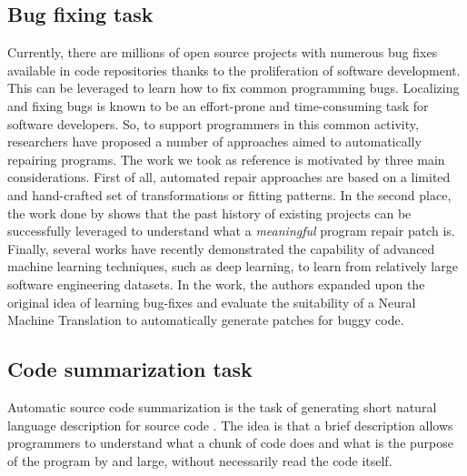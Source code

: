 \subsection{Bug fixing task}
Currently, there are millions of open source projects with numerous bug fixes available in code repositories
thanks to the proliferation of software development. This can be leveraged to learn how to fix common programming bugs. 
Localizing and fixing bugs is known to be an effort-prone and time-consuming task for software developers.
So, to support programmers in this common activity, researchers have proposed a number of approaches aimed to automatically repairing programs.
The work we took as reference is motivated by three main considerations. First of all, automated repair approaches are based on a limited and hand-crafted
set of transformations or fitting patterns. In the second place, the work done by \cite{} shows that the past history of 
existing projects can be successfully leveraged to understand what a \textit{meaningful} program repair patch is. Finally, 
several works have recently demonstrated the capability of advanced machine learning techniques, such as deep learning, to learn from relatively large software engineering
datasets. In the work, the authors expanded upon the original idea of learning bug-fixes and evaluate the suitability of a Neural Machine Translation to automatically
generate patches for buggy code.


\subsection{Code summarization task}
Automatic source code summarization is the task of generating short natural language description 
for source code \cite{Leclair2020}. The idea is that a brief description allows programmers to understand
what a chunk of code does and what is the purpose of the program by and large, without necessarily read the code 
itself.\\

